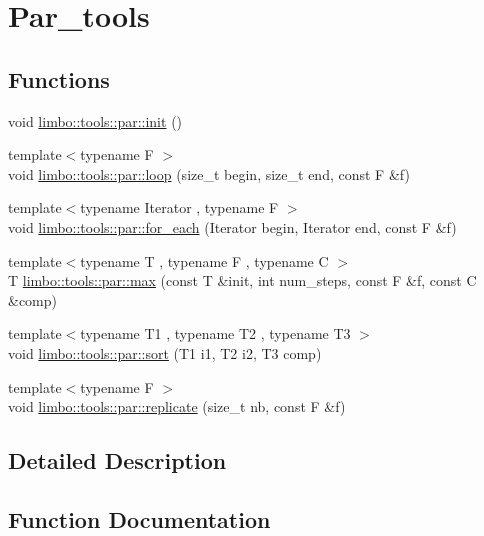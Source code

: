 \hypertarget{group__par__tools}{}\section{Par\+\_\+tools}
\label{group__par__tools}
\subsection*{Functions}
\begin{DoxyCompactItemize}
\item 
void \hyperlink{group__par__tools_ga1d650a019b6c1bb551cb42f1c3f5ef82}{limbo\+::tools\+::par\+::init} ()
\item 
{\footnotesize template$<$typename F $>$ }\\void \hyperlink{group__par__tools_ga0e0d97b2a06005eac32290a846ccef91}{limbo\+::tools\+::par\+::loop} (size\+\_\+t begin, size\+\_\+t end, const F \&f)
\item 
{\footnotesize template$<$typename Iterator , typename F $>$ }\\void \hyperlink{group__par__tools_gaa7bbb8a640ed2b66101d57b5b565457f}{limbo\+::tools\+::par\+::for\+\_\+each} (Iterator begin, Iterator end, const F \&f)
\item 
{\footnotesize template$<$typename T , typename F , typename C $>$ }\\T \hyperlink{group__par__tools_gaf3fdc36fc4e94ad4cac72c803234b6ac}{limbo\+::tools\+::par\+::max} (const T \&init, int num\+\_\+steps, const F \&f, const C \&comp)
\item 
{\footnotesize template$<$typename T1 , typename T2 , typename T3 $>$ }\\void \hyperlink{group__par__tools_gab29bca0dac2a8917b8447bc52d376f1c}{limbo\+::tools\+::par\+::sort} (T1 i1, T2 i2, T3 comp)
\item 
{\footnotesize template$<$typename F $>$ }\\void \hyperlink{group__par__tools_gade6005a5ea74ca5203203d30210c0f22}{limbo\+::tools\+::par\+::replicate} (size\+\_\+t nb, const F \&f)
\end{DoxyCompactItemize}


\subsection{Detailed Description}


\subsection{Function Documentation}
\hypertarget{group__par__tools_gaa7bbb8a640ed2b66101d57b5b565457f}{}
